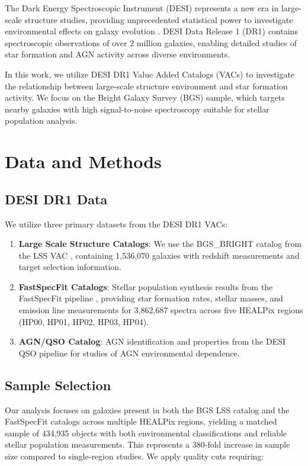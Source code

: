 \documentclass[twocolumn]{aastex701}
\begin{document}
The Dark Energy Spectroscopic Instrument (DESI) represents a new era in large-scale structure studies, providing unprecedented statistical power to investigate environmental effects on galaxy evolution \citep{DESI2016}. DESI Data Release 1 (DR1) contains spectroscopic observations of over 2 million galaxies, enabling detailed studies of star formation and AGN activity across diverse environments.

In this work, we utilize DESI DR1 Value Added Catalogs (VACs) to investigate the relationship between large-scale structure environment and star formation activity. We focus on the Bright Galaxy Survey (BGS) sample, which targets nearby galaxies with high signal-to-noise spectroscopy suitable for stellar population analysis.

\section{Data and Methods}

\subsection{DESI DR1 Data}

We utilize three primary datasets from the DESI DR1 VACs:

\begin{enumerate}
\item \textbf{Large Scale Structure Catalogs}: We use the BGS\_BRIGHT catalog from the LSS VAC \citep{Hahn2023}, containing 1,536,070 galaxies with redshift measurements and target selection information.

\item \textbf{FastSpecFit Catalogs}: Stellar population synthesis results from the FastSpecFit pipeline \citep{Moustakas2023}, providing star formation rates, stellar masses, and emission line measurements for 3,862,687 spectra across five HEALPix regions (HP00, HP01, HP02, HP03, HP04).

\item \textbf{AGN/QSO Catalog}: AGN identification and properties from the DESI QSO pipeline for studies of AGN environmental dependence.
\end{enumerate}

\subsection{Sample Selection}

Our analysis focuses on galaxies present in both the BGS LSS catalog and the FastSpecFit catalogs across multiple HEALPix regions, yielding a matched sample of 434,935 objects with both environmental classifications and reliable stellar population measurements. This represents a 380-fold increase in sample size compared to single-region studies. We apply quality cuts requiring:
\end{document}
